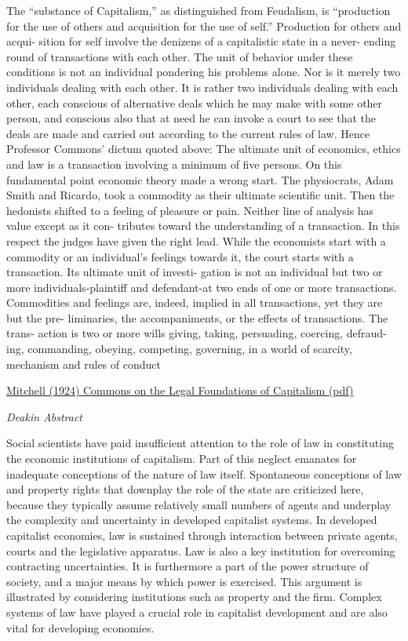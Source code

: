 \documentclass[
]{book}
\begin{document}
The ``substance of Capitalism,''
as distinguished from Feudalism, is ``production for the use of others
and acquisition for the use of self.'' Production for others and acqui-
sition for self involve the denizens of a capitalistic state in a never-
ending round of transactions with each other. The unit of behavior
under these conditions is not an individual pondering his problems
alone. Nor is it merely two individuals dealing with each other. It is
rather two individuals dealing with each other, each conscious of
alternative deals which he may make with some other person, and
conscious also that at need he can invoke a court to see that the deals
are made and carried out according to the current rules of law. Hence
Professor Commons' dictum quoted above: The ultimate unit of
economics, ethics and law is a transaction involving a minimum of five
persons.
On this fundamental point economic theory made a wrong start.
The physiocrats, Adam Smith and Ricardo, took a commodity as their
ultimate scientific unit. Then the hedonists shifted to a feeling of
pleasure or pain. Neither line of analysis has value except as it con-
tributes toward the understanding of a transaction. In this respect
the judges have given the right lead.
While the economists start with a commodity or an individual's feelings
towards it, the court starts with a transaction. Its ultimate unit of investi-
gation is not an individual but two or more individuals-plaintiff and
defendant-at two ends of one or more transactions. Commodities and
feelings are, indeed, implied in all transactions, yet they are but the pre-
liminaries, the accompaniments, or the effects of transactions. The trans-
action is two or more wills giving, taking, persuading, coercing, defraud-
ing, commanding, obeying, competing, governing, in a world of scarcity,
mechanism and rules of conduct

\href{pdf/Mitchell_1924_Commons_Legal_Foundations_of_Capitalism.pdf}{Mitchell (1924) Commons on the Legal Foundations of Capitalism (pdf)}

\emph{Deakin Abstract}

Social scientists have paid insufficient attention to the role of law in constituting the economic institutions of capitalism. Part of this neglect emanates for inadequate conceptions of the nature of law itself. Spontaneous conceptions of law and property rights that downplay the role of the state are criticized here, because they typically assume relatively small numbers of agents and underplay the complexity and uncertainty in developed capitalist systems. In developed capitalist economies, law is sustained through interaction between private agents, courts and the legislative apparatus. Law is also a key institution for overcoming contracting uncertainties. It is furthermore a part of the power structure of society, and a major means by which power is exercised. This argument is illustrated by considering institutions such as property and the firm. Complex systems of law have played a crucial role in capitalist development and are also vital for developing economies.
\end{document}
